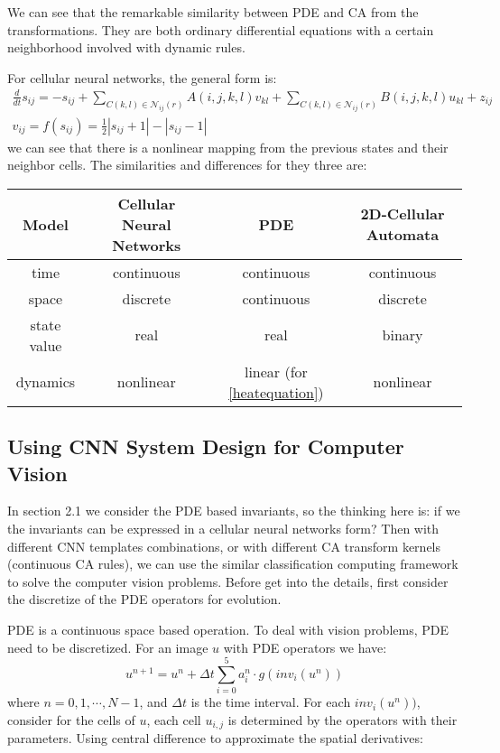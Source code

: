 \documentclass{amsart}
\theoremstyle{definition}
\theoremstyle{remark}
\numberwithin{equation}{section}
\begin{document}
We can see that the remarkable similarity between PDE and CA from the transformations.
They are both ordinary differential equations with a certain neighborhood involved with dynamic rules.

For cellular neural networks, the general form is:
\begin{equation}
\label{cnnState}
\begin{split}
\frac{d}{dt}s_{ij} = -s_{ij} + \sum_{C(k,l) \in \mathcal{N}_{ij}(r)}A(i, j, k, l)v_{kl} + \sum_{C(k,l) \in \mathcal{N}_{ij}(r)}B(i, j, k, l)u_{kl} + z_{ij} \\
v_{ij} = f(s_{ij}) = \frac{1}{2}|s_{ij} + 1| - |s_{ij} - 1|
\end{split}
\end{equation}
we can see that there is a nonlinear mapping from the previous states and their neighbor cells.
The similarities and differences for they three are:

\begin{center}
\label{pdeinvariants}
\begin{tabular}{cccc}
\hline
Model & Cellular Neural Networks & PDE & 2D-Cellular Automata\\
\hline
time &  continuous  & continuous & continuous \\
space &  discrete  & continuous & discrete \\
state value &  real   & real & binary \\
dynamics &  nonlinear  & linear (for \ref{heatequation})  & nonlinear\\
\hline
\end{tabular}
\end{center}






\subsection{Using CNN System Design for Computer Vision}
In section 2.1 we consider the PDE based invariants, so the thinking here is: if we the invariants can be expressed in a cellular neural networks form?
Then with different CNN templates combinations, or with different CA transform kernels (continuous CA rules), we can use the similar classification computing framework to solve the computer vision problems.
Before get into the details, first consider the discretize of the PDE operators for evolution.

PDE is a continuous space based operation. To deal with vision problems, PDE need to be discretized.
For an image $u$ with PDE operators we have:
\begin{equation}
u^{n+1} = u^{n} + \Delta t \sum_{i=0}^5 a_i^n \cdot g(inv_i(u^n))
\end{equation}
where $n = 0, 1,\cdots, N-1$, and $\Delta t$ is the time interval.
For each $inv_i(u^n))$, consider for the cells of $u$, each cell $u_{i,j}$ is determined by the operators with their parameters.
Using central difference to approximate the spatial derivatives:
\end{document}
